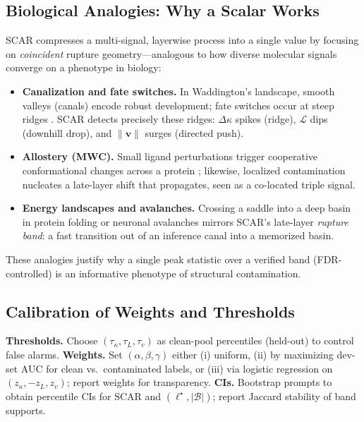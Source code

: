 \documentclass[11pt]{article}
\begin{document}
\subsection{Biological Analogies: Why a Scalar Works}
\label{subsec:scar-bio}
SCAR compresses a multi-signal, layerwise process into a single value by focusing on \emph{coincident} rupture geometry—analogous to how diverse molecular signals converge on a phenotype in biology:
\begin{itemize}\setlength\itemsep{2pt}
\item \textbf{Canalization and fate switches.} In Waddington’s landscape, smooth valleys (canals) encode robust development; fate switches occur at steep ridges \citep{waddington1957strategy}. SCAR detects precisely these ridges: $\Delta\kappa$ spikes (ridge), $\mathcal{L}$ dips (downhill drop), and $\|\mathbf{v}\|$ surges (directed push).
\item \textbf{Allostery (MWC).} Small ligand perturbations trigger cooperative conformational changes across a protein \citep{monod1965mwc}; likewise, localized contamination nucleates a late-layer shift that propagates, seen as a co-located triple signal.
\item \textbf{Energy landscapes and avalanches.} Crossing a saddle into a deep basin in protein folding \citep{onuchic1997protein} or neuronal avalanches \citep{beggs2003neuronal} mirrors SCAR’s late-layer \emph{rupture band}: a fast transition out of an inference canal into a memorized basin.
\end{itemize}
These analogies justify why a single peak statistic over a verified band (FDR-controlled) is an informative phenotype of structural contamination.

\vspace{0.6em}
\subsection{Calibration of Weights and Thresholds}
\label{subsec:scar-calibration}
\textbf{Thresholds.} Choose $(\tau_\kappa,\tau_L,\tau_v)$ as clean-pool percentiles (held-out) to control false alarms.  
\textbf{Weights.} Set $(\alpha,\beta,\gamma)$ either (i) uniform, (ii) by maximizing dev-set AUC for clean vs.\ contaminated labels, or (iii) via logistic regression on $(z_\kappa,-z_L,z_v)$; report weights for transparency.  
\textbf{CIs.} Bootstrap prompts to obtain percentile CIs for $\mathrm{SCAR}$ and $(\ell^\star,|\mathcal{B}|)$; report Jaccard stability of band supports.
\end{document}
